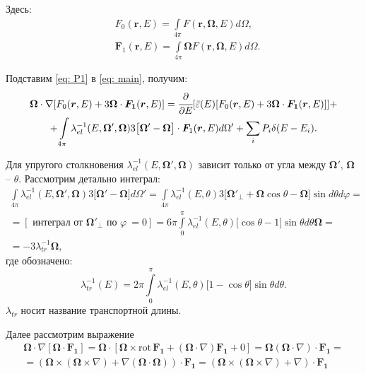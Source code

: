 \documentclass[a4paper,12pt]{article} %
\newcommand{\df}[1]{\cfrac{\partial}{\partial #1}}
\renewcommand{\vec}[1]{\bm{#1}}
\newcommand{\rot}{\mathrm{rot}\,}
\newcommand{\eps}{\varepsilon}
\renewcommand{\phi}{\varphi}
\begin{document}
Здесь:
\begin{align}
    & F_0(\vec{r}, E) = \int\limits_{4\pi} F(\vec{r}, \vec{\Omega}, E) d\Omega, \\
    & \vec{F}_1(\vec{r}, E) = \int\limits_{4\pi} \vec{\Omega} F(\vec{r}, \vec{\Omega}, E) d\Omega.
\end{align}

Подставим \eqref{eq: P1} в \eqref{eq: main}, получим:
\begin{equation}\label{eq: P1is}
\begin{gathered}
    \vec{\Omega}\cdot\nabla [ F_0(\vec{r}, E) + 3 \vec{\Omega}\cdot\vec{F_1}(\vec{r}, E) ] =
    \df{E}[\bar{\eps}(E)[ F_0(\vec{r}, E) + 3 \vec{\Omega}\cdot\vec{F_1}(\vec{r}, E) ]] + \\ +
    \int\limits_{4\pi} \lambda^{-1}_{el}(E, \vec{\Omega}', \vec{\Omega}) 3 \big[ \vec{\Omega}' - \vec{\Omega}\big] \cdot \vec{F}_1 (\vec{r}, E) d\Omega' +
    \sum_{i} P_i\delta(E - E_i).
\end{gathered}
\end{equation}

Для упругого столкновения $\lambda^{-1}_{el}(E, \vec{\Omega}', \vec{\Omega})$ зависит только от угла между $\vec{\Omega}'$, $\vec{\Omega}$ -- $\theta$. Рассмотрим детально интеграл:
\begin{equation}
\begin{gathered}
    \int\limits_{4\pi} \lambda^{-1}_{el}(E, \vec{\Omega}', \vec{\Omega}) 3 \big[ \vec{\Omega}' - \vec{\Omega}\big] d\Omega' =
    \int\limits_{4\pi} \lambda^{-1}_{el}(E, \theta) 3 \big[ \vec{\Omega}'_{\perp} + \vec{\Omega} \cos \theta - \vec{\Omega}\big] \sin d\theta d\phi = \\
    = [\text{ интеграл от } \vec{\Omega}'_{\perp} \text{ по } \phi ~ = 0] =
    6\pi\int\limits_{0}^\pi \lambda^{-1}_{el}(E, \theta) \big[ \cos \theta - 1\big] \sin \theta d\theta \vec{\Omega} = \\ =
    - 3 \lambda^{-1}_{tr} \vec{\Omega},
\end{gathered}
\end{equation}
где обозначено:
\begin{equation}
    \lambda^{-1}_{tr}(E) = 2\pi\int\limits_{0}^\pi \lambda^{-1}_{el}(E, \theta) \big[ 1 -\cos \theta \big] \sin \theta d\theta.
\end{equation}
$\lambda_{tr}$ носит название транспортной длины.

Далее рассмотрим выражение
\begin{equation}
\begin{gathered}
    \vec{\Omega}\cdot\nabla [\vec{\Omega}\cdot\vec{F_1}] =
    \vec{\Omega}\cdot[
    \vec{\Omega} \times \rot \vec{F_1} +
    (\vec{\Omega}\cdot\nabla) \vec{F_1} + 0
    ] = \vec{\Omega}(\vec{\Omega}\cdot\nabla)\cdot \vec{F_1} = \\
    = (\vec{\Omega}\times(\vec{\Omega}\times\nabla) + \nabla (\vec{\Omega}\cdot\vec{\Omega}))\cdot\vec{F_1} =
    (\vec{\Omega}\times(\vec{\Omega}\times\nabla) + \nabla)\cdot\vec{F_1}
\end{gathered}
\end{equation}
\end{document}
